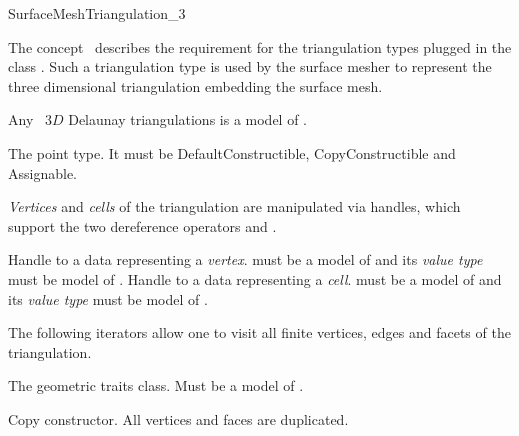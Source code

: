 \begin{ccRefConcept}{SurfaceMeshTriangulation_3}

\ccDefinition

The concept \ccRefName\ describes the requirement 
for the triangulation types 
plugged in the class
. 
Such a  triangulation type is
used by the surface mesher  
to represent the three dimensional triangulation
embedding the surface mesh.

Any \cgal\ $3D$ Delaunay
triangulations is a  model of \ccRefName.


\ccTypes

{The point type. It must be DefaultConstructible, CopyConstructible and
  Assignable.}

\emph{Vertices} and \emph{cells} of the triangulation are manipulated via
handles, which support the two dereference operators  and
.

{Handle to a data representing a \emph{vertex}.  must be
  a model of  and its \emph{value type} must be model of
  .}
\ccGlue
{}
{Handle to a data representing a \emph{cell}.  must be a
  model of  and its \emph{value type} must be model of
  .}

\ccGlue
{}

The following iterators allow one to visit all finite vertices, edges and
facets of the triangulation.

\ccGlue
{}
\ccGlue
{}

{The geometric traits class. Must be a model of
.}


\ccCreation
{}  %


{Copy constructor. All vertices and faces are duplicated.}


\end{ccRefConcept}
